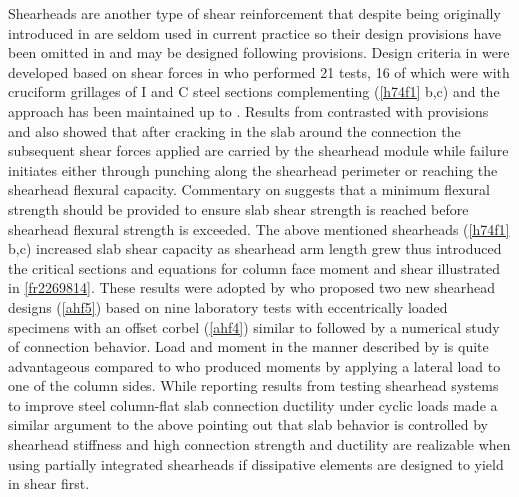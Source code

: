 \documentclass[twocolumn]{article} %
\begin{document}
Shearheads are another type of shear reinforcement that despite being originally introduced in \cite{wheeler1936} are seldom used in current practice so their design provisions have been omitted in \cite{aci31819} and may be designed following \cite{ACI31814} provisions. Design criteria in \cite{aci31871} were developed based on shear forces in \cite{hawkins1974,corley1968} who performed 21 tests, 16 of which were with cruciform grillages of $\mathrm{I}$ and $\mathrm{C}$ steel sections complementing \cite{corley1968,hawkins1974}(\ref{h74f1} b,c) and the approach has been maintained up to \cite{ACI31814}. Results from \cite{hawkins1974a} contrasted with \cite{aci31871} provisions and \cite{hawkins1974} also showed that after cracking in the slab around the connection the subsequent shear forces applied are carried by the shearhead module while failure initiates either through punching along the shearhead perimeter or reaching the shearhead flexural capacity. Commentary on \citet[Section 22.6.9]{ACI31814} suggests that a minimum flexural strength should be provided to ensure slab shear strength is reached before shearhead flexural strength is exceeded. The above mentioned shearheads (\ref{h74f1} b,c) increased slab shear capacity as shearhead arm length grew thus \cite{corley1968,hawkins1974} introduced the critical sections and equations for column face moment and shear illustrated in \ref{fr2269814}. These results were adopted by \cite{Al-hamd2018} who proposed two new shearhead designs (\ref{ahf5}) based on nine laboratory tests with eccentrically loaded specimens with an offset corbel (\ref{ahf4}) similar to \cite{kruger1998} followed by a numerical study of connection behavior. Load and moment in the manner described by \cite{kruger1998,Al-hamd2018} is quite advantageous compared to \cite{ghali2000stud,kang2009nonlinear,moreno2008punching,song2012effective,hawkins1974,islam1976} who produced moments by applying a lateral load to one of the column sides. While reporting results from testing shearhead systems to improve steel column-flat slab connection ductility under cyclic loads \cite{EDER2012239} made a similar argument to the above pointing out that slab behavior is controlled by shearhead stiffness and high connection strength and ductility are realizable when using partially integrated shearheads if dissipative elements are designed to yield in shear first. 
\end{document}
